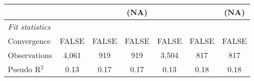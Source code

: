 \begin{tabular}{lcccccc}
                                                                              &                        &                        & (NA)                   &                        &                        & (NA)\\   
   \midrule
   \emph{Fit statistics}\\
   Convergence                                                                &FALSE                   & FALSE                  & FALSE                  & FALSE                  & FALSE                  & FALSE\\  
   Observations                                                               & 4,061                  & 919                    & 919                    & 3,504                  & 817                    & 817\\  
   Pseudo R$^2$                                                               & 0.13                   & 0.17                   & 0.17                   & 0.13                   & 0.18                   & 0.18\\  
   

\end{tabular}
